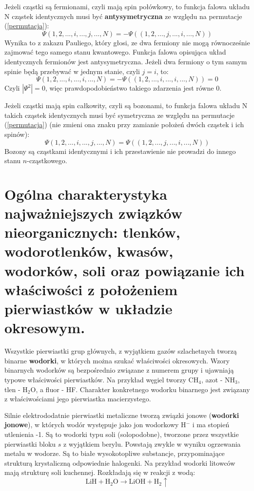 \documentclass{article}
\begin{document}
Jeżeli cząstki są fermionami, czyli mają spin połówkowy, to funkcja falowa układu N cząstek identycznych musi być \textbf{antysymetryczna} ze względu na permutacje (\ref{permutacja}):
\begin{equation*}
    \Psi(1, 2, ...,i,...,j,...,N) =-\Psi((1, 2, ...,j,...,i,...,N) )
\end{equation*}
Wynika to z zakazu Pauliego, który głosi, ze dwa fermiony nie mogą równocześnie zajmować tego samego stanu kwantowego. Funkcja falowa opisująca układ identycznych fermionów jest antysymetryczna.
Jeżeli dwa fermiony o tym samym spinie będą przebywać w jednym stanie, czyli $j=i$, to:
\begin{equation*}
    \Psi(1, 2, ...,i,...,i,...,N) =-\Psi((1, 2, ...,i,...,i,...,N))=0
\end{equation*}
Czyli $|\Psi^2|=0$, więc prawdopodobieństwo takiego zdarzenia jest równe 0.

Jeżeli cząstki mają spin całkowity, czyli są bozonami, to funkcja falowa układu N takich cząstek identycznych musi być symetryczna ze względu na permutacje (\ref{permutacja}) (nie zmieni ona znaku przy zamianie położeń dwóch cząstek i ich spinów):
\begin{equation*}
    \Psi(1, 2, ...,i,...,j,...,N) = \Psi((1, 2, ...,j,...,i,...,N) )
\end{equation*}
Bozony są cząstkami identycznymi i ich przestawienie nie prowadzi do innego stanu $n$-cząstkowego.


\section{Ogólna charakterystyka najważniejszych związków nieorganicznych: tlenków, wodorotlenków, kwasów, wodorków, soli oraz powiązanie ich właściwości z położeniem pierwiastków w układzie okresowym.}

Wszystkie pierwiastki grup głównych, z wyjątkiem gazów szlachetnych tworzą binarne \textbf{wodorki}, w których można szukać właściwości okresowych. Wzory binarnych wodorków są bezpośrednio związane z numerem grupy i ujawniają typowe właściwości pierwiastków. Na przykład węgiel tworzy CH$_4$, azot - NH$_3$, tlen - H$_2$O, a fluor - HF. Charakter konkretnego wodorku binarnego jest związany z właściwościami jego pierwiastka macierzystego. 

Silnie elektrododatnie pierwiastki metaliczne tworzą związki jonowe (\textbf{wodorki jonowe}), w których wodór występuje jako jon wodorkowy H$^-$ i ma stopień utlenienia -1. Są to wodorki typu soli (solopodobne), tworzone przez wszystkie pierwiastki bloku $s$ z wyjątkiem berylu. Powstają zwykle w wyniku ogrzewania metalu w wodorze. Są to białe wysokotopliwe substancje, przypominające strukturą krystaliczną odpowiednie halogenki. Na przykład wodorki litowców mają strukturę soli kuchennej. Rozkładają się w reakcji z wodą:
\begin{equation*}
    \text{LiH}+\text{H}_2\text{O}\rightarrow \text{LiOH}+\text{H}_2\uparrow 
\end{equation*}
\end{document}
